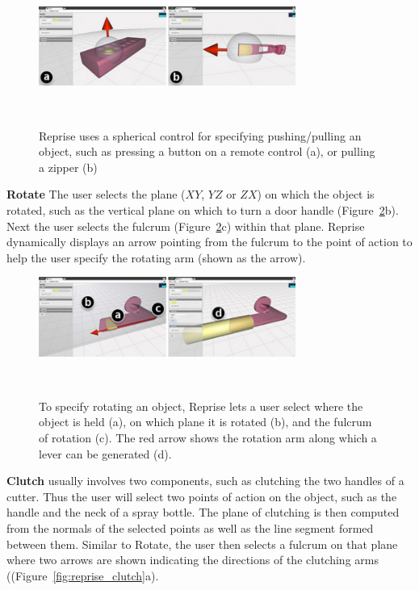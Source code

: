 \begin{figure}[h!]
  \centering
  \includegraphics[width=0.75\textwidth]{figures/reprise_pushpull_v1.pdf}
  \caption{Reprise uses a spherical control for specifying pushing/pulling an object, such as pressing a button on a remote control (a), or pulling a zipper (b)}~\label{fig:reprise_pushpull}
\end{figure}

\textbf{Rotate} The user selects the plane ($XY$, $YZ$ or $ZX$) on which the object is rotated, such as the vertical plane on which to turn a door handle (Figure~\ref{fig:reprise_rotate}b). Next the user selects the fulcrum (Figure~\ref{fig:reprise_rotate}c) within that plane. Reprise dynamically displays an arrow pointing from the fulcrum to the point of action to help the user specify the rotating arm (shown as the arrow).
\vskip 5pt

\begin{figure}[h!]
  \centering
  \includegraphics[width=0.75\textwidth]{figures/reprise_rotate_v2.pdf}
  \caption{To specify rotating an object, Reprise lets a user select where the object is held (a), on which plane it is rotated (b), and the fulcrum of rotation (c). The red arrow shows the rotation arm along which a lever can be generated (d).}~\label{fig:reprise_rotate}
\end{figure}

\textbf{Clutch} usually involves two components, such as clutching the two handles of a cutter. Thus the user will select two points of action on the object, such as the handle and the neck of a spray bottle. The plane of clutching is then computed from the normals of the selected points as well as the line segment formed between them. Similar to Rotate, the user then selects a fulcrum on that plane where two arrows are shown indicating the directions of the clutching arms ((Figure~\ref{fig:reprise_clutch}a).

